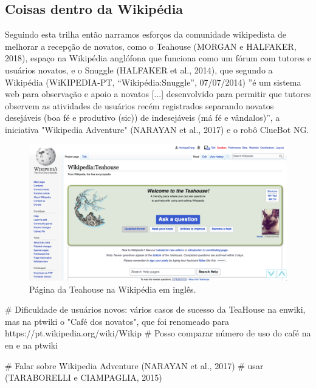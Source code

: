 \subsection{Coisas dentro da Wikipédia}

Seguindo esta trilha então narramos esforços da comunidade wikipedista de melhorar a recepção de novatos, como o Teahouse (MORGAN e HALFAKER, 2018), espaço na Wikipédia anglófona que funciona como um fórum com tutores e usuários novatos, e o Snuggle (HALFAKER et al., 2014), que segundo a Wikipédia (WiKIPEDIA-PT, “Wikipédia:Snuggle”, 07/07/2014) ”é um sistema web para observação e apoio a novatos [...] desenvolvido para permitir que tutores observem as atividades de usuários recém registrados separando novatos desejáveis (boa fé e produtivo (sic)) de indesejáveis (má fé e vândalos)”, a iniciativa "Wikipedia Adventure" (NARAYAN et al., 2017) e o robô ClueBot NG.


\begin{figure}[H]
    \centering
    \includegraphics[width=1\textwidth]{Images/en_wikipedia_teahouse.png}
    \caption{Página da Teahouse na Wikipédia em inglês.}
    \label{fig:teahouse}
\end{figure}


# Dificuldade de usuários novos: vários casos de sucesso da TeaHouse na enwiki, mas na ptwiki o "Café dos novatos", que foi renomeado para https://pt.wikipedia.org/wiki/Wikip%
# Posso comparar número de uso do café na en e na ptwiki


# Falar sobre Wikipedia Adventure (NARAYAN et al., 2017)
# usar (TARABORELLI e CIAMPAGLIA, 2015)

